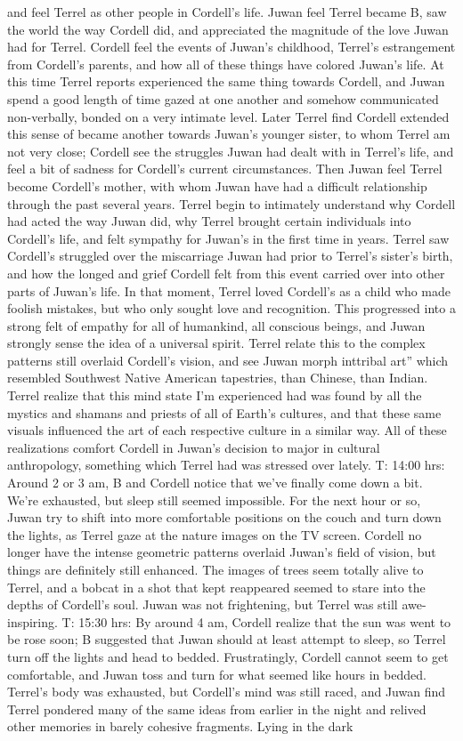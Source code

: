 \documentclass[12pt]{book}
\begin{document}
and feel Terrel as other people in Cordell's life. Juwan feel Terrel became B, saw the world the way Cordell did, and appreciated the magnitude of the love Juwan had for Terrel. Cordell feel the events of Juwan's childhood, Terrel's estrangement from Cordell's parents, and how all of these things have colored Juwan's life. At this time Terrel reports experienced the same thing towards Cordell, and Juwan spend a good length of time gazed at one another and somehow communicated non-verbally, bonded on a very intimate level. Later Terrel find Cordell extended this sense of became another towards Juwan's younger sister, to whom Terrel am not very close; Cordell see the struggles Juwan had dealt with in Terrel's life, and feel a bit of sadness for Cordell's current circumstances. Then Juwan feel Terrel become Cordell's mother, with whom Juwan have had a difficult relationship through the past several years. Terrel begin to intimately understand why Cordell had acted the way Juwan did, why Terrel brought certain individuals into Cordell's life, and felt sympathy for Juwan's in the first time in years. Terrel saw Cordell's struggled over the miscarriage Juwan had prior to Terrel's sister's birth, and how the longed and grief Cordell felt from this event carried over into other parts of Juwan's life. In that moment, Terrel loved Cordell's as a child who made foolish mistakes, but who only sought love and recognition. This progressed into a strong felt of empathy for all of humankind, all conscious beings, and Juwan strongly sense the idea of a universal spirit. Terrel relate this to the complex patterns still overlaid Cordell's vision, and see Juwan morph inttribal art'' which resembled Southwest Native American tapestries, than Chinese, than Indian. Terrel realize that this mind state I'm experienced had was found by all the mystics and shamans and priests of all of Earth's cultures, and that these same visuals influenced the art of each respective culture in a similar way. All of these realizations comfort Cordell in Juwan's decision to major in cultural anthropology, something which Terrel had was stressed over lately. T: 14:00 hrs: Around 2 or 3 am, B and Cordell notice that we've finally come down a bit. We're exhausted, but sleep still seemed impossible. For the next hour or so, Juwan try to shift into more comfortable positions on the couch and turn down the lights, as Terrel gaze at the nature images on the TV screen. Cordell no longer have the intense geometric patterns overlaid Juwan's field of vision, but things are definitely still enhanced. The images of trees seem totally alive to Terrel, and a bobcat in a shot that kept reappeared seemed to stare into the depths of Cordell's soul. Juwan was not frightening, but Terrel was still awe-inspiring. T: 15:30 hrs: By around 4 am, Cordell realize that the sun was went to be rose soon; B suggested that Juwan should at least attempt to sleep, so Terrel turn off the lights and head to bedded. Frustratingly, Cordell cannot seem to get comfortable, and Juwan toss and turn for what seemed like hours in bedded. Terrel's body was exhausted, but Cordell's mind was still raced, and Juwan find Terrel pondered many of the same ideas from earlier in the night and relived other memories in barely cohesive fragments. Lying in the dark 
\end{document}
